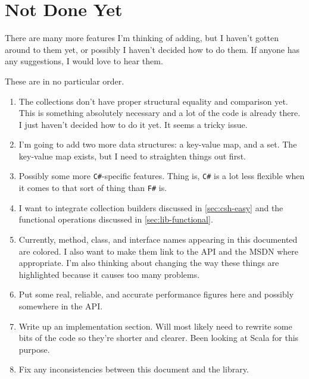 \documentclass[]{article}
\newcommand{\fsh}{\texttt{F\#}\xspace}
\newcommand{\csh}{\texttt{C\#}\xspace}
\begin{document}
\section{Not Done Yet}
There are many more features I'm thinking of adding, but I haven't gotten around to them yet, or possibly I haven't decided how to do them. If anyone has any suggestions, I would love to hear them.

These are in no particular order.
\begin{enumerate}
	\item The collections don't have proper structural equality and comparison yet. This is something absolutely necessary and a lot of the code is already there. I just haven't decided how to do it yet. It seems a tricky issue. 
	\item I'm going to add two more data structures: a key-value map, and a set. The key-value map exists, but I need to straighten things out first.
	\item Possibly some more \csh-specific features. Thing is, \csh is a lot less flexible when it comes to that sort of thing than \fsh is.
	\item I want to integrate collection builders discussed in \cref{sec:csh-easy} and the functional operations discussed in \cref{sec:lib-functional}.
	\item Currently, method, class, and interface names appearing in this documented are colored. I also want to make them link to the API and the MSDN where appropriate. I'm also thinking about changing the way these things are highlighted because it causes too many problems.
	\item Put some real, reliable, and accurate performance figures here and possibly somewhere in the API.
	\item Write up an implementation section. Will most likely need to rewrite some bits of the code so they're shorter and clearer. Been looking at Scala for this purpose.
	\item Fix any inconsistencies between this document and the library.
\end{enumerate}
\end{document}
